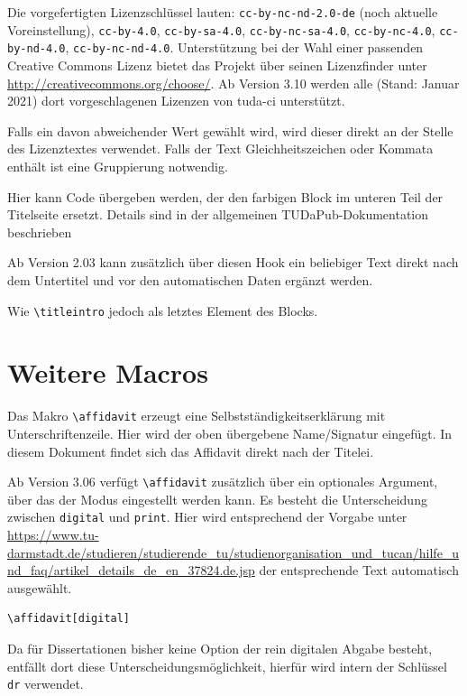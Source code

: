 \documentclass[
	ngerman,
	ruledheaders=section,%
	class=report,%
	thesis={type=bachelor},%
	accentcolor=9c,%
	custommargins=true,%
	marginpar=false,%
	parskip=half-,%
	fontsize=11pt,%
]{tudapub}
\let\code\texttt
\let\tbs\textbackslash
\begin{document}
\begin{description}
	Die vorgefertigten Lizenzschlüssel lauten: \verb+cc-by-nc-nd-2.0-de+ (noch aktuelle Voreinstellung), \verb+cc-by-4.0+, \verb+cc-by-sa-4.0+, \verb+cc-by-nc-sa-4.0+, \verb+cc-by-nc-4.0+, \verb+cc-by-nd-4.0+, \verb+cc-by-nc-nd-4.0+.
	Unterstützung bei der Wahl einer passenden Creative Commons Lizenz bietet das Projekt über seinen Lizenzfinder unter \url{http://creativecommons.org/choose/}.
	Ab Version 3.10 werden alle (Stand: Januar 2021) dort vorgeschlagenen Lizenzen von tuda-ci unterstützt.

	Falls ein davon abweichender Wert gewählt wird, wird dieser direkt an der Stelle des Lizenztextes verwendet. Falls der Text Gleichheitszeichen oder Kommata enthält ist eine Gruppierung notwendig.
	\item[titlegraphic] Hier kann Code übergeben werden, der den farbigen Block im unteren Teil der Titelseite ersetzt. Details sind in der allgemeinen TUDaPub-Dokumentation beschrieben \cite{tudapub}
	\item[titleintro] Ab Version 2.03 kann zusätzlich über diesen Hook ein beliebiger Text direkt nach dem Untertitel und vor den automatischen Daten ergänzt werden.
	\item[titleaddendum] Wie \code{\tbs{}titleintro} jedoch als letztes Element des Blocks.
\end{description}

\section{Weitere Macros}
Das Makro \verb+\affidavit+ erzeugt eine Selbstständigkeitserklärung mit Unterschriftenzeile. Hier wird der oben übergebene Name/Signatur eingefügt.
In diesem Dokument findet sich das Affidavit direkt nach der Titelei.

Ab Version 3.06 verfügt \verb+\affidavit+ zusätzlich über ein optionales Argument, über das der Modus eingestellt werden kann.
Es besteht die Unterscheidung zwischen \verb+digital+ und \verb+print+. Hier wird entsprechend der Vorgabe unter \url{https://www.tu-darmstadt.de/studieren/studierende_tu/studienorganisation_und_tucan/hilfe_und_faq/artikel_details_de_en_37824.de.jsp} der entsprechende Text automatisch ausgewählt.

\begin{verbatim}
\affidavit[digital]
\end{verbatim}

Da für Dissertationen bisher keine Option der rein digitalen Abgabe besteht, entfällt dort diese Unterscheidungsmöglichkeit, hierfür wird intern der Schlüssel \verb+dr+ verwendet.
\end{document}
